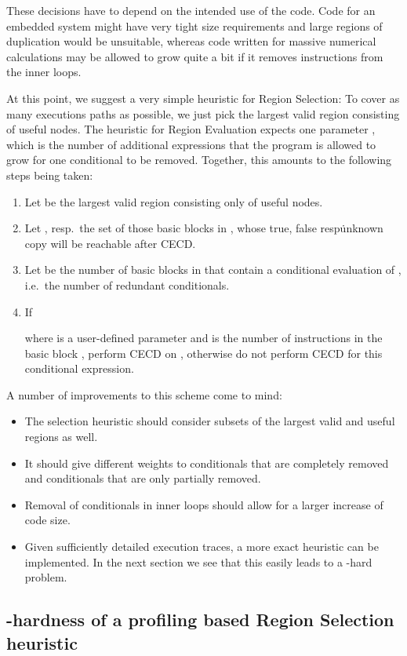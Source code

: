 \documentclass[halfparskip]{scrartcl}
\begin{document}
These decisions have to depend on the intended use of the code. Code for an embedded system might have very tight size requirements and large regions of duplication would be unsuitable, whereas code written for massive numerical calculations may be allowed to grow quite a bit if it removes instructions from the inner loops.

At this point, we suggest a very simple heuristic for Region Selection: To cover as many executions paths as possible, we just pick the largest valid region consisting of useful nodes. The heuristic for Region Evaluation expects one parameter , which is the number of additional expressions that the program is allowed to grow for one conditional to be removed. Together, this amounts to the following steps being taken:

\begin{enumerate}
\item Let  be the largest valid region consisting only of useful nodes.
\item Let ,  resp.\  the set of those basic blocks in , whose true, false resp\. unknown copy will be reachable after CECD.
\item Let  be the number of basic blocks in  that contain a conditional evaluation of , i.e.\ the number of redundant conditionals.
\item If

where  is a user-defined parameter and  is the number of instructions in the basic block , perform CECD on , otherwise do not perform CECD for this conditional expression.
\end{enumerate}

A number of improvements to this scheme come to mind:
\begin{itemize}
\item The selection heuristic should consider subsets of the largest valid and useful regions as well.
\item It should give different weights to conditionals that are completely removed and conditionals that are only partially removed.
\item Removal of conditionals in inner loops should allow for a larger increase of code size.
\item Given sufficiently detailed execution traces, a more exact heuristic can be implemented. In the next section we see that this easily leads to a -hard problem.
\end{itemize}

\subsection{-hardness of a profiling based Region Selection heuristic}
\end{document}
